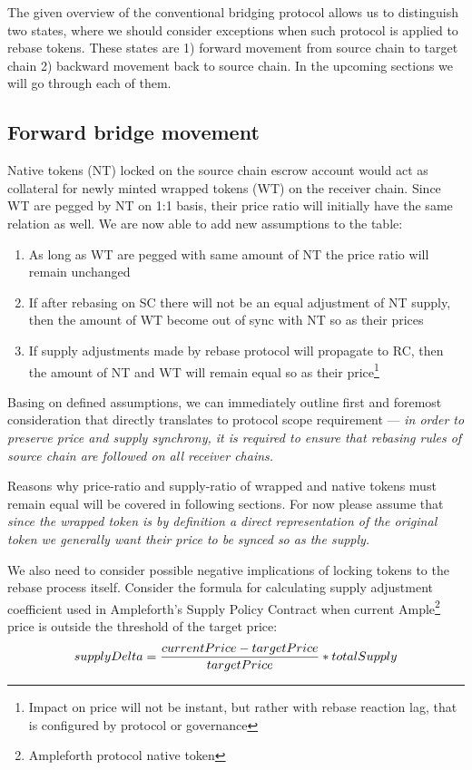\documentclass{article}
\begin{document}
The given overview of the conventional bridging protocol allows us to distinguish two states, where we should consider exceptions when such protocol is applied to rebase tokens. These states are 1) forward movement from source chain to target chain 2) backward movement back to source chain. In the upcoming sections we will go through each of them.

\subsection{Forward bridge movement}

Native tokens (NT) locked on the source chain escrow account would act as collateral for newly minted wrapped tokens (WT) on the receiver chain. Since WT are pegged by NT on 1:1 basis, their price ratio will initially have the same relation as well. We are now able to add new assumptions to the table:

\begin{enumerate}
	\item As long as WT are pegged with same amount of NT the price ratio will remain unchanged
	\item If after rebasing on SC there will not be an equal adjustment of NT supply, then the amount of WT become out of sync with NT so as their prices
	\item If supply adjustments made by rebase protocol will propagate to RC, then the amount of NT and WT will remain equal so as their price\footnote{Impact on price will not be instant, but rather with rebase reaction lag, that is configured by protocol or governance}
\end{enumerate}

Basing on defined assumptions, we can immediately outline first and foremost consideration that directly translates to protocol scope requirement --- \textit{in order to preserve price and supply synchrony, it is required to ensure that rebasing rules of source chain are followed on all receiver chains.}

Reasons why price-ratio and supply-ratio of wrapped and native tokens must remain equal will be covered in following sections. For now please assume that \textit{since the wrapped token is by definition a direct representation of the original token we generally want their price to be synced so as the supply.}

We also need to consider possible negative implications of locking tokens to the rebase process itself. Consider the formula for calculating supply adjustment coefficient used in Ampleforth's Supply Policy Contract \cite{kuo2019ampleforth} when current Ample\footnote{Ampleforth protocol native token} price is outside the threshold of the target price:
\[supplyDelta = \frac{currentPrice-targetPrice}{targetPrice}\ast\\totalSupply\]
\end{document}
